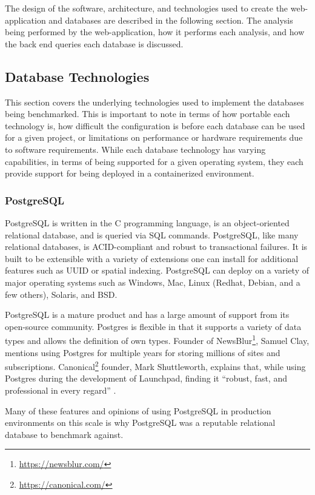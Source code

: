 The design of the software, architecture, and technologies used to create the web-application and databases are described in the following section. The analysis being performed by the web-application, how it performs each analysis, and how the back end queries each database is discussed.

\subsection{Database Technologies}

This section covers the underlying technologies used to implement the databases being benchmarked. This is important to note in terms of how portable each technology is, how difficult the configuration is before each database can be used for a given project, or limitations on performance or hardware requirements due to software requirements. While each database technology has varying capabilities, in terms of being supported for a given operating system, they each provide support for being deployed in a containerized environment.

\subsubsection{PostgreSQL}
PostgreSQL is written in the C programming language, is an object-oriented relational database, and is queried via SQL commands. PostgreSQL, like many relational databases, is ACID-compliant and robust to transactional failures. It is built to be extensible with a variety of extensions one can install for additional features such as UUID or spatial indexing. PostgreSQL can deploy on a variety of major operating systems such as Windows, Mac, Linux (Redhat, Debian, and a few others), Solaris, and BSD.

PostgreSQL is a mature product and has a large amount of support from its open-source community. Postgres is flexible in that it supports a variety of data types and allows the definition of own types. Founder of NewsBlur\footnote{\url{https://newsblur.com/}}, Samuel Clay, mentions using Postgres for multiple years for storing millions of sites and subscriptions. Canonical\footnote{\url{https://canonical.com/}} founder, Mark Shuttleworth, explains that, while using Postgres during the development of Launchpad, finding it ``robust, fast, and professional in every regard'' \cite{postgres-about}.

Many of these features and opinions of using PostgreSQL in production environments on this scale is why PostgreSQL was a reputable relational database to benchmark against.

